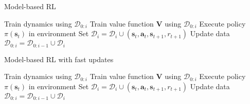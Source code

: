 \documentclass{article}
\newcommand{\state}{\ensuremath{\mathbf{s}}}
\newcommand{\action}{\ensuremath{\mathbf{a}}}
\newcommand{\dataset}{\ensuremath{\mathcal{D}}}
\newcommand{\stateValueFn}{\ensuremath{\mathbf{V}}}
\newcommand{\policy}{\ensuremath{\pi}}
\begin{document}
\begin{minipage}{0.499\textwidth}
\begin{algorithm}[H]
\caption{Model-based RL}\label{alg-mbrl}
\begin{algorithmic}[1]
    \State Train dynamics using $\dataset_{0:i}$
    \State Train value function $\stateValueFn$ using $\dataset_{0:i}$
      \State Execute policy $\policy(\state_{t})$ in environment
      \State Set $\mathcal{D}_{i} = \mathcal{D}_{i} \cup (\state_{t}, \action_{t}, \state_{t+1}, r_{t+1})$
    \EndFor
    \State Update data $\mathcal{D}_{0:i} = \mathcal{D}_{0:i-1} \cup \mathcal{D}_{i}$
\EndFor
\end{algorithmic}
\end{algorithm}
\end{minipage}
\hfill
\begin{minipage}{0.499\textwidth}
\begin{algorithm}[H]
\caption{Model-based RL with fast updates}\label{alg-mbrl-with-fast-updates-simple}
\begin{algorithmic}[1]
    \State Train dynamics using $\dataset_{0:i}$
    \State Train value function $\stateValueFn$ using $\dataset_{0:i}$
      \State Execute policy $\policy(\state_{t})$ in environment
      \State Set $\mathcal{D}_{i} = \mathcal{D}_{i} \cup (\state_{t}, \action_{t}, \state_{t+1}, r_{t+1})$
    \EndFor
    \State Update data $\mathcal{D}_{0:i} = \mathcal{D}_{0:i-1} \cup \mathcal{D}_{i}$
\EndFor
\end{algorithmic}
\end{algorithm}
\end{minipage}
\end{document}
